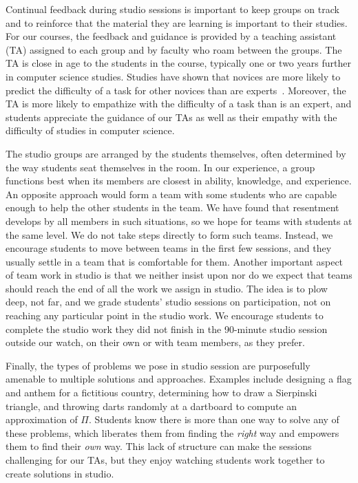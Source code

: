 Continual feedback during studio sessions is important to keep groups on
track and to reinforce that the material they are learning is important to
their studies.  For our courses, the feedback and guidance is provided by
a teaching assistant (TA) assigned to each group and by faculty who 
roam between the groups.  The TA is close in age to the students in the
course, typically one or two years further in computer science studies.
Studies have shown that novices are more likely to predict the difficulty
of a task for other novices than are experts~\cite{Hinds:1999}.  Moreover,
the TA is more likely to empathize with the difficulty of a task than is
an expert, and students appreciate the guidance of our TAs as well as their
empathy with the difficulty of studies in computer science.

The studio groups are arranged by the students themselves, often determined
by the way students seat themselves in the room. In our experience, a group
functions best when its members are closest in ability, knowledge, and
experience.  An opposite approach would form a team with some students who
are capable enough to help the other students in the team.  We have found
that resentment develops by all members in such situations, so we hope for
teams with students at the same level.   We do not take steps directly to
form such teams.  Instead, we encourage students to move between teams in
the first few sessions, and they usually settle in a team that is comfortable
for them.  Another important aspect of team work in studio is that we neither
insist upon nor do we expect that teams should reach the end of all the work
we assign in studio.  The idea is to plow deep, not far, and we grade
students' studio sessions on participation, 
not on reaching any particular point in the
studio work.  We encourage students to complete the studio work they did not
finish in the 90-minute studio session outside our watch, 
on their own or with team members,
as they prefer.

Finally, the types of problems we pose in studio session are purposefully
amenable to multiple solutions and approaches.  Examples include designing
a flag and anthem for a fictitious country, determining how to draw a Sierpinski
triangle, and throwing darts randomly at a dartboard to compute an approximation
of $\Pi$. Students know there is more than one way to solve any of these
problems, which liberates them from finding the \emph{right} way and
empowers them to find their \emph{own} way.  This lack of structure can make
the sessions challenging for our TAs, but they enjoy watching students work
together to create solutions in studio.



